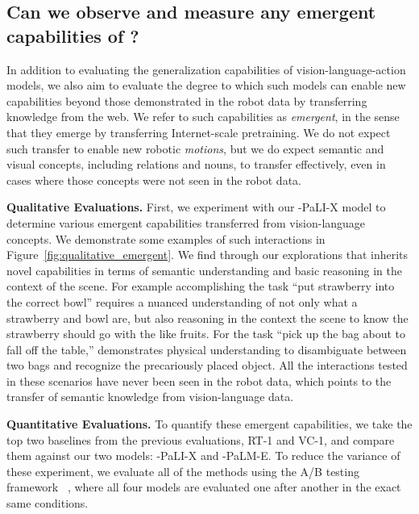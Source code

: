 \subsection{Can we observe and measure any emergent capabilities of \methodname?}
\label{sec:emergent}
In addition to evaluating the generalization capabilities of vision-language-action models, we also aim to evaluate the degree to which such models can enable new capabilities beyond those demonstrated in the robot data by transferring knowledge from the web. We refer to such capabilities as \emph{emergent}, in the sense that they emerge by transferring Internet-scale pretraining. We do not expect such transfer to enable new robotic \emph{motions}, but we do expect semantic and visual concepts, including relations and nouns, to transfer effectively, even in cases where those concepts were not seen in the robot data. 

\textbf{Qualitative Evaluations.} First, we experiment with our \methodname-PaLI-X model to determine various emergent capabilities transferred from vision-language concepts. We demonstrate some examples of such interactions in Figure~\ref{fig:qualitative_emergent}.
We find through our explorations that \methodname inherits novel capabilities in terms of semantic understanding and basic reasoning in the context of the scene.
For example accomplishing the task ``put strawberry into the correct bowl'' requires a nuanced understanding of not only what a strawberry and bowl are, but also reasoning in the context the scene to know the strawberry should go with the like fruits.
For the task ``pick up the bag about to fall off the table,'' \methodname demonstrates physical understanding to disambiguate between two bags and recognize the precariously placed object.
All the interactions tested in these scenarios have never been seen in the robot data, which points to the transfer of semantic knowledge from vision-language data.

\textbf{Quantitative Evaluations.}
To quantify these emergent capabilities, we take the top two baselines from the previous evaluations, RT-1 and VC-1, and compare them against our two models: \methodname-PaLI-X and \methodname-PaLM-E. To reduce the variance of these experiment, we evaluate all of the methods using the A/B testing framework~\citep{fisher1936design}%
, where all four models are evaluated one after another in the exact same conditions.

